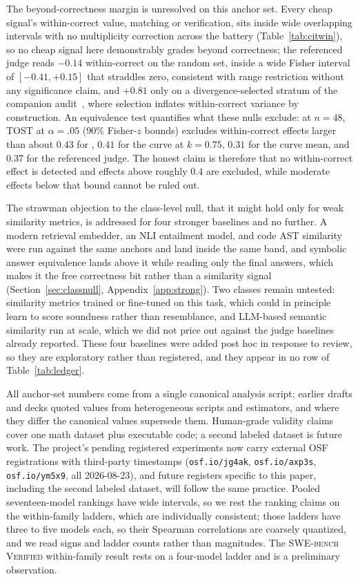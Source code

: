 The beyond-correctness margin is unresolved on this anchor set.
Every cheap signal's within-correct value, matching or verification, sits inside wide overlapping intervals with no multiplicity correction across the battery (Table~\ref{tab:citwin}), so no cheap signal here demonstrably grades beyond correctness; the referenced judge reads $-0.14$ within-correct on the random set, inside a wide Fisher interval of $[-0.41, +0.15]$ that straddles zero, consistent with range restriction without any significance claim, and $+0.81$ only on a divergence-selected stratum of the companion audit~\cite{companionA}, where selection inflates within-correct variance by construction.
An equivalence test quantifies what these nulls exclude: at $n{=}48$, TOST at $\alpha{=}.05$ (90\% Fisher-$z$ bounds) excludes within-correct effects larger than about $0.43$ for \tfa, $0.41$ for the curve at $k{=}0.75$, $0.31$ for the curve mean, and $0.37$ for the referenced judge.
The honest claim is therefore that no within-correct effect is detected and effects above roughly $0.4$ are excluded, while moderate effects below that bound cannot be ruled out.

The strawman objection to the class-level null, that it might hold only for weak similarity metrics, is addressed for four stronger baselines and no further.
A modern retrieval embedder, an NLI entailment model, and code AST similarity were run against the same anchors and land inside the same band, and symbolic answer equivalence lands above it while reading only the final answers, which makes it the free correctness bit rather than a similarity signal (Section~\ref{sec:classnull}, Appendix~\ref{app:strong}).
Two classes remain untested: similarity metrics trained or fine-tuned on this task, which could in principle learn to score soundness rather than resemblance, and LLM-based semantic similarity run at scale, which we did not price out against the judge baselines already reported.
These four baselines were added post hoc in response to review, so they are exploratory rather than registered, and they appear in no row of Table~\ref{tab:ledger}.

All anchor-set numbers come from a single canonical analysis script; earlier drafts and decks quoted values from heterogeneous scripts and estimators, and where they differ the canonical values supersede them.
Human-grade validity claims cover one math dataset plus executable code; a second labeled dataset is future work.
The project's pending registered experiments now carry external OSF registrations with third-party timestamps (\texttt{osf.io/jg4ak}, \texttt{osf.io/axp3s}, \texttt{osf.io/ym5x9}, all 2026-08-23), and future registers specific to this paper, including the second labeled dataset, will follow the same practice.
Pooled seventeen-model rankings have wide intervals, so we rest the ranking claims on the within-family ladders, which are individually consistent; those ladders have three to five models each, so their Spearman correlations are coarsely quantized, and we read signs and ladder counts rather than magnitudes.
The \textsc{SWE-bench Verified} within-family result rests on a four-model ladder and is a preliminary observation.
